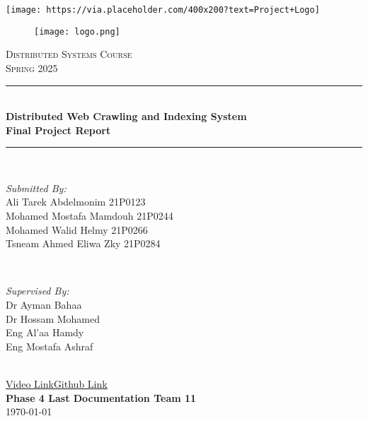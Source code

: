 \documentclass[12pt,a4paper]{report}
\begin{document}
\begin{titlepage}
    \centering
    \vspace*{0cm}
    \texttt{[image: https://via.placeholder.com/400x200?text=Project+Logo]}\\[0cm]
    \begin{figure}
        \centering
        \texttt{[image: logo.png]}
        \label{fig:enter-label}
    \end{figure}
    \textsc{\LARGE Distributed Systems Course}\\[0.4cm]
    \textsc{\Large Spring 2025}\\[0.4cm]
    
    \rule{\linewidth}{0.2mm}\\[0.3cm]
    { \huge \bfseries Distributed Web Crawling and Indexing System\\
    Final Project Report}\\
    \rule{\linewidth}{0.15mm}\\[1.5cm]
    
    \begin{minipage}{0.55\textwidth}
        \begin{flushleft} \large
            \emph{Submitted By:}\\
            Ali Tarek Abdelmonim 21P0123\\
            Mohamed Mostafa Mamdouh 21P0244\\
            Mohamed Walid Helmy 21P0266\\
            Tsneam Ahmed Eliwa Zky 21P0284\\
        \end{flushleft}
    \end{minipage}~
    \begin{minipage}{0.4\textwidth}
        \begin{flushright} \large
            \emph{Supervised By:} \\
            Dr Ayman Bahaa\\
            Dr Hossam Mohamed\\
            Eng Al'aa Hamdy\\
            Eng Mostafa Ashraf\\
        \end{flushright}
    \end{minipage}\\[2cm]
    \uline{\href{https://drive.google.com/drive/folders/1iCCx7A3Jf54sl7szdAXko1SLWDfB3Sef}{Video Link}}\hspace{1cm}\uline{\href{https://github.com/mohamedmostafam0/Distributed-Web-Crawling-and-Indexing-System-GCP}{Github Link}}\\
   \centering \textbf{Phase 4  Last Documentation  Team 11} \\
    {\large \today}
    
    \vfill
\end{titlepage}
\end{document}
